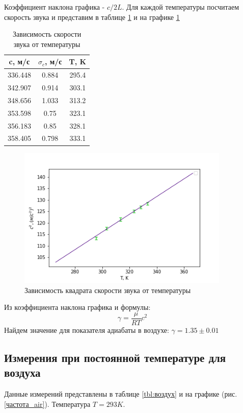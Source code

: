 \documentclass[a4paper,12pt]{article} %
\begin{document}
Коэффициент наклона графика - $c/2L$. Для каждой температуры посчитаем скорость звука и представим в таблице \ref{tbl:c_T} и на графике \ref{img:c_T}
\begin{table}[h!] 
 \caption{Зависимость скорости звука от температуры}
\label{tbl:c_T}
  \begin{tabular}{|c|c|c|} \hline c, м/с & $\sigma_c$, м/с  & T, K \\ \hline 336.448 & 0.884 & 295.4 \\ \hline 342.907 & 0.914 & 303.1 \\ \hline 348.656 & 1.033 & 313.2 \\ \hline 353.598 & 0.75 & 323.1 \\ \hline 356.183 & 0.85 & 328.1 \\ \hline 358.405 & 0.798 & 333.1 \\ \hline
\end{tabular} 
\end{table}

\begin{figure}[h!]
\begin{center}
\includegraphics[width=0.9\textwidth]{CC_T}
\end{center}
\caption{Зависимость квадрата скорости звука от температуры} \label{img:c_T}
\end{figure}

Из коэффициента наклона графика и формулы:
\begin{equation}
\gamma = \frac{\mu}{RT}c^2
\end{equation}
Найдем значение для показателя адиабаты в воздухе:
$\gamma = 1.35 \pm 0.01$


\subsection{Измерения при постоянной температуре для воздуха}
Данные измерений представлены в таблице \ref{tbl:воздух} и на графике (рис. \ref{частота_air}). Температура $T = 293 K$.
\end{document}
